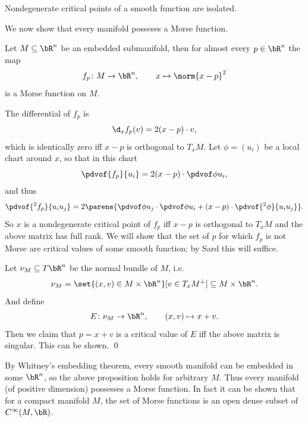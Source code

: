 \bcoro

    Nondegenerate critical points of a smooth function are isolated.

\ecoro

We now show that every manifold posseses a Morse function.

\bprop

    Let $M\subseteq\bR^n$ be an embedded submanifold, then for almost every $p\in\bR^n$ the map
    $$ f_p\colon M\to\bR^n,\qquad x\mapsto\norm{x-p}^2 $$
    is a Morse function on $M$.

\eprop

\bproof

    The differential of $f_p$ is
    $$ \d_xf_p(v) = 2(x-p)\cdot v , $$
    which is identically zero iff $x-p$ is orthogonal to $T_xM$.
    Let $\phi=(u_i)$ be a local chart around $x$, so that in this chart
    $$ \pdvof{f_p}{u_i} = 2(x-p)\cdot\pdvof\phi{u_i} , $$
    and thus
    $$ \pdvof{^2f_p}{u_iu_j} = 2\parens{\pdvof\phi{u_j}\cdot\pdvof\phi{u_i}+(x-p)\cdot\pdvof{^2\phi}{u_iu_j}}.
    $$
    So $x$ is a nondegenerate critical point of $f_p$ iff $x-p$ is orthogonal to $T_xM$ and the above
    matrix has full rank.
    We will show that the set of $p$ for which $f_p$ is not Morse are critical values of some smooth function;
    by Sard this will suffice.

    Let $\nu_M\subseteq T\bR^n$ be the normal bundle of $M$, i.e.
    $$ \nu_M = \set{(x,v)\in M\times\bR^n}[v\in T_xM^\perp]\subseteq M\times\bR^n . $$
    And define
    $$ E\colon\nu_M\to\bR^n,\qquad (x,v)\mapsto x+v . $$
    Then we claim that $p=x+v$ is a critical value of $E$ iff the above matrix is singular.
    This can be shown.
    \qed

\eproof

By Whitney's embedding theorem, every smooth manifold can be embedded in some $\bR^n$, so the above proposition
holds for arbitrary $M$.
Thus every manifold (of positive dimension) possesses a Morse function.
In fact it can be shown that for a compact manifold $M$, the set of Morse functions is an open dense subset
of $C^\infty(M,\bR)$.

